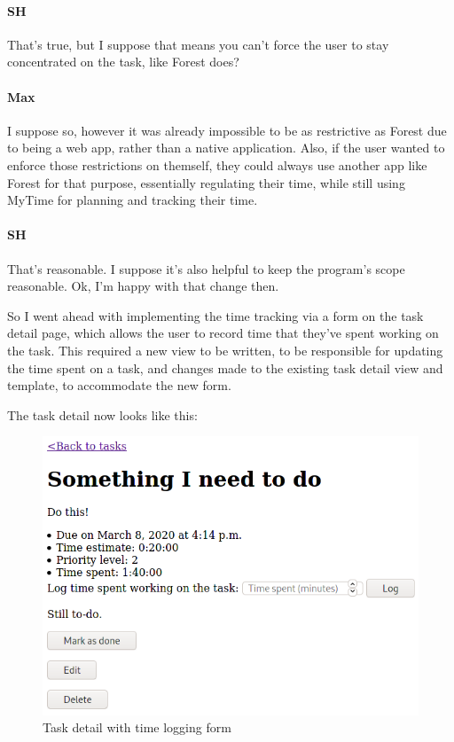 \documentclass{article}
\begin{document}
\paragraph{SH} That's true,
but I suppose that means you can't force the user to stay concentrated on the task,
like Forest does?
\paragraph{Max} I suppose so,
however it was already impossible to be as restrictive as Forest due to being a web app,
rather than a native application.
Also, if the user wanted to enforce those restrictions on themself,
they could always use another app like Forest for that purpose,
essentially regulating their time,
while still using MyTime for planning and tracking their time.
\paragraph{SH} That's reasonable.
I suppose it's also helpful to keep the program's scope reasonable.
Ok, I'm happy with that change then.

So I went ahead with implementing the time tracking via a form on the task detail page,
which allows the user to record time that they've spent working on the task.
This required a new view to be written,
to be responsible for updating the time spent on a task,
and changes made to the existing task detail view and template,
to accommodate the new form.

The task detail now looks like this:
\begin{figure}[H]
	\centering
	\includegraphics[width=\linewidth]{Screenshots/task_detail_with_time.png}
	\caption{Task detail with time logging form}
	\label{fig:task_detail2}
\end{figure}
\end{document}
